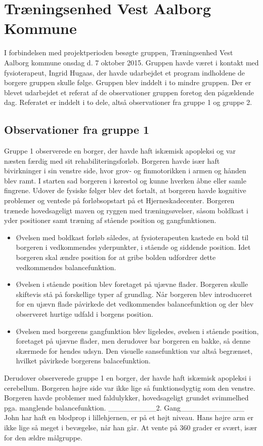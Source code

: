 \chapter{Træningsenhed Vest Aalborg Kommune}
I forbindelsen med projektperioden besøgte gruppen, Træningsenhed Vest Aalborg kommune onsdag d. 7 oktober 2015. Gruppen havde været i kontakt med fysioterapeut, Ingrid Hugaas, der havde udarbejdet et program indholdene de borgere gruppen skulle følge. Gruppen blev inddelt i to mindre gruppen. Der er blevet udarbejdet et referat af de observationer gruppen foretog den pågældende dag. Referatet er inddelt i to dele, altså observationer fra gruppe 1 og gruppe 2. 

\section{Observationer fra gruppe 1}
Gruppe 1 observerede en borger, der havde haft iskæmisk apopleksi og var næsten færdig med sit rehabiliteringsforløb. Borgeren havde især haft bivirkninger i sin venstre side, hvor grov- og finmotorikken i armen og hånden blev ramt. I starten sad borgeren i kørestol og kunne hverken åbne eller samle fingrene. Udover de fysiske følger blev det fortalt, at borgeren havde kognitive problemer og ventede på forløbsopstart på et Hjerneskadecenter. Borgeren trænede hovedsageligt maven og ryggen med træningsøvelser, såsom boldkast i yder positioner samt træning af  stående position og gangfunktionen. 
\begin{itemize}
\item Øvelsen med boldkast forløb således, at fysioterapeuten kastede en bold til borgeren i vedkommendes yderpunkter, i stående og siddende position. Idet borgeren skal ændre position for at gribe bolden udfordrer dette vedkommendes balancefunktion. 
\item Øvelsen i stående position blev foretaget på ujævne flader. Borgeren skulle skiftevis stå på forskellige typer af grundlag. Når borgeren blev introduceret for en ujævn flade påvirkede det vedkommendes balancefunktion og der blev observeret hurtige udfald i borgens position. 
\item Øvelsen med borgerens gangfunktion blev ligeledes, øvelsen i stående position, foretaget på ujævne flader, men derudover bar borgeren en bakke, så denne skærmede for hendes udsyn. Den visuelle sansefunktion var altså begrænset, hvilket påvirkede borgerens balacefunktion. 
\end{itemize}

Derudover observerede gruppe 1 en borger, der havde haft iskæmisk apopleksi i cerebellum. Borgeren højre side var ikke lige så funktionsdygtig som den venstre. Borgeren havde problemer med faldulykker, hovedsageligt grundet svimmelhed pga. manglende balancefunktion. 
_________2. Gang____________
John har haft en blodprop i lillehjernen, er på et højt niveau. Hans højre arm er ikke lige så meget i bevægelse, når han går.
At vente på 360 grader er svært, især for den ældre målgruppe.

